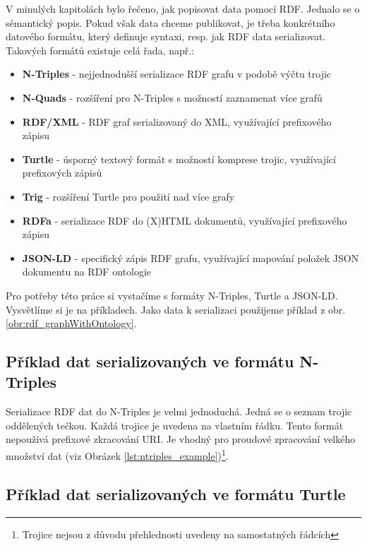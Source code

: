 V minulých kapitolách bylo řečeno, jak popisovat data pomocí RDF. Jednalo se o sémantický popis. Pokud však data chceme publikovat, je třeba konkrétního datového formátu, který definuje syntaxi, resp. jak RDF data serializovat. Takových formátů existuje celá řada, např.:

\begin{itemize}
\item \textbf{N-Triples\cite{N-Triples}} - nejjednodušší serializace RDF grafu v podobě výčtu trojic
\item \textbf{N-Quads\cite{N-Quads}} - rozšíření pro N-Triples s možností zaznamenat více grafů
\item \textbf{RDF/XML\cite{RDF/XML}} - RDF graf serializovaný do XML, využívající prefixového zápisu
\item \textbf{Turtle\cite{Turtle}} - úsporný textový formát s možností komprese trojic, využívající prefixových zápisů
\item \textbf{Trig\cite{Trig}} - rozšíření Turtle pro použití nad více grafy
\item \textbf{RDFa\cite{RDFa}} - serializace RDF do (X)HTML{\cite{XHtml}} dokumentů, využívající prefixového zápisu
\item \textbf{JSON-LD\cite{JSON-LD}} - specifický zápis RDF grafu, využívající mapování položek JSON dokumentu na RDF ontologie
\end{itemize}

Pro potřeby této práce si vystačíme s formáty N-Triples, Turtle a JSON-LD. Vysvětlíme si je na příkladech. Jako data k serializaci použijeme příklad z obr. \ref{obr:rdf_graphWithOntology}.

\subsection{Příklad dat serializovaných ve formátu N-Triples}

Serializace RDF dat do N-Triples je velmi jednoduchá. Jedná se o seznam trojic oddělených tečkou. Každá trojice je uvedena na vlastním řádku. Tento formát nepoužívá prefixové zkracování URI. Je vhodný pro proudové zpracování velkého množství dat (viz Obrázek \ref{lst:ntriples_example})\footnote{Trojice nejsou z důvodu přehlednosti uvedeny na samostatných řádcích}.\\



\subsection{Příklad dat serializovaných ve formátu Turtle}


